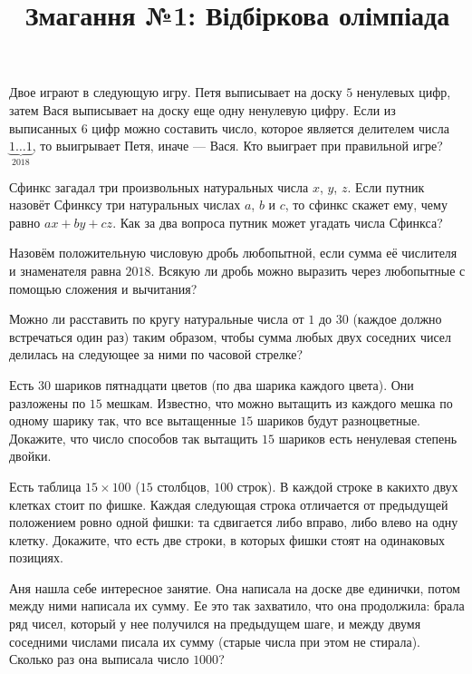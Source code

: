 


\title{Змагання №1: Відбіркова олімпіада}
\maketitle\begin{problem}
	Двое играют в следующую игру. Петя выписывает на доску $5$ ненулевых цифр, затем Вася выписывает на доску еще одну ненулевую цифру. Если из выписанных $6$ цифр можно составить число, которое является делителем числа $\underset{2018}{\underbrace{1\ldots1}}$, то выигрывает Петя, иначе --- Вася. Кто выиграет при правильной игре?
\end{problem}

\begin{problem}
	Сфинкс загадал три произвольных натуральных числа $x$, $y$, $z$. Если путник назовёт Сфинксу три натуральных числах $a$, $b$ и $c$, то сфинкс скажет ему, чему равно $ax + by + cz$. Как за два вопроса путник может угадать числа Сфинкса?
\end{problem}

\begin{problem}
	Назовём положительную числовую дробь любопытной, если сумма её числителя и знаменателя равна $2018$. Всякую ли дробь можно выразить через любопытные с помощью сложения и вычитания?
\end{problem}

\begin{problem}
	Можно ли расставить по кругу натуральные числа от $1$ до $30$ (каждое должно встречаться один раз) таким образом, чтобы сумма любых двух соседних чисел делилась на следующее за ними по часовой стрелке?
\end{problem}

\begin{problem}
	Есть $30$ шариков пятнадцати цветов (по два шарика каждого цвета). Они разложены по $15$ мешкам. Известно, что можно вытащить из каждого мешка по одному шарику так, что все вытащенные $15$ шариков будут разноцветные. Докажите, что число способов так вытащить $15$ шариков есть ненулевая степень двойки.
\end{problem}

\begin{problem}
	Есть таблица $15 \times 100$ ($15$ столбцов, $100$ строк). В каждой строке в какихто двух клетках стоит по фишке. Каждая следующая строка отличается от предыдущей положением ровно одной фишки: та сдвигается либо вправо, либо влево на одну клетку. Докажите, что есть две строки, в которых фишки стоят на одинаковых позициях.
\end{problem}

\begin{problem}
	Аня нашла себе интересное занятие. Она написала на доске две единички, потом между ними написала их сумму. Ее это так захватило, что она продолжила: брала ряд чисел, который у нее получился на предыдущем шаге, и между двумя соседними числами писала их сумму (старые числа при этом не стирала). Сколько раз она выписала число $1000$?
\end{problem}


